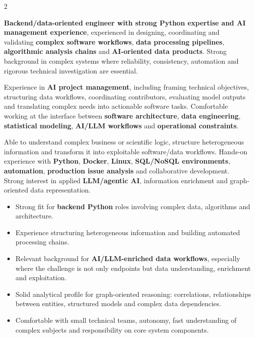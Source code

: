 \documentclass[8pt,a4paper,ragged2e,withhyper]{altacv}
\begin{document}
\begin{paracol}{2}
\switchcolumn


\textbf{Backend/data-oriented engineer with strong Python expertise and AI management experience}, experienced in designing, coordinating and validating \textbf{complex software workflows}, \textbf{data processing pipelines}, \textbf{algorithmic analysis chains} and \textbf{AI-oriented data products}. Strong background in complex systems where reliability, consistency, automation and rigorous technical investigation are essential.

Experience in \textbf{AI project management}, including framing technical objectives, structuring data workflows, coordinating contributors, evaluating model outputs and translating complex needs into actionable software tasks. Comfortable working at the interface between \textbf{software architecture}, \textbf{data engineering}, \textbf{statistical modeling}, \textbf{AI/LLM workflows} and \textbf{operational constraints}.

Able to understand complex business or scientific logic, structure heterogeneous information and transform it into exploitable software/data workflows. Hands-on experience with \textbf{Python}, \textbf{Docker}, \textbf{Linux}, \textbf{SQL/NoSQL environments}, \textbf{automation}, \textbf{production issue analysis} and collaborative development. Strong interest in applied \textbf{LLM/agentic AI}, information enrichment and graph-oriented data representation.


\begin{itemize}
  \item Strong fit for \textbf{backend Python} roles involving complex data, algorithms and architecture.
  \item Experience structuring heterogeneous information and building automated processing chains.
  \item Relevant background for \textbf{AI/LLM-enriched data workflows}, especially where the challenge is not only endpoints but data understanding, enrichment and exploitation.
  \item Solid analytical profile for graph-oriented reasoning: correlations, relationships between entities, structured models and complex data dependencies.
  \item Comfortable with small technical teams, autonomy, fast understanding of complex subjects and responsibility on core system components.
\end{itemize}


\end{paracol}
\end{document}
